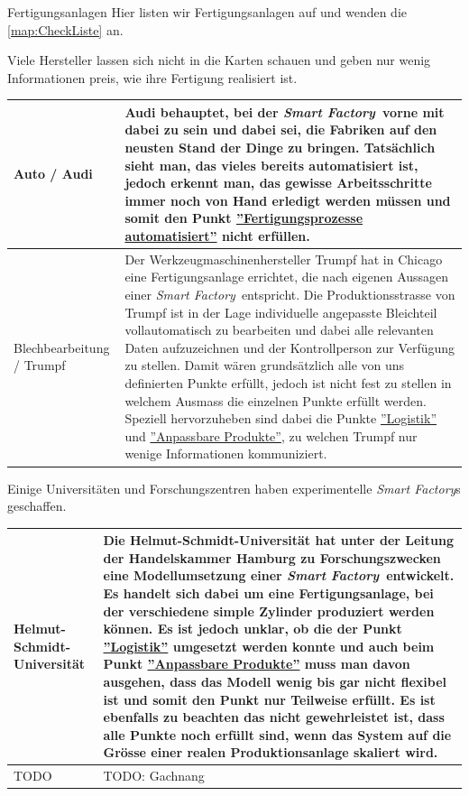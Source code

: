 \documentclass{article}
\def\SmartFactory{\textcolor{DarkestGray}{\textit{Smart Factory}}}
\begin{document}
\begin{Map}{Fertigungsanlagen}\label{map:Fertigungsanlagen}
Hier listen wir Fertigungsanlagen auf und wenden die \ref{map:CheckListe} an.

Viele Hersteller lassen sich nicht in die Karten schauen und geben nur wenig Informationen preis, wie ihre Fertigung realisiert ist. 
\par\medskip
\begin{tabular}{p{3.2cm}p{8cm}}\toprule
  Auto / Audi & Audi behauptet, bei der \SmartFactory\ vorne mit dabei zu sein und dabei sei, die Fabriken auf den neusten Stand der Dinge zu bringen. Tatsächlich sieht man, das vieles bereits automatisiert ist, jedoch erkennt man, das gewisse Arbeitsschritte immer noch von Hand erledigt werden müssen und somit den Punkt \hyperlink{CheckListe:Fertigungsprozess}{''Fertigungsprozesse automatisiert''} nicht erfüllen.\cite{Audi}\cite{AudiKommentarlos}\\\midrule
  Blechbearbeitung / Trumpf & Der Werkzeugmaschinenhersteller Trumpf hat in Chicago eine Fertigungsanlage errichtet, die nach eigenen Aussagen einer \SmartFactory\ entspricht. Die Produktionsstrasse von Trumpf ist in der Lage individuelle angepasste Bleichteil vollautomatisch zu bearbeiten und dabei alle relevanten Daten aufzuzeichnen und der Kontrollperson zur Verfügung zu stellen. Damit wären grundsätzlich alle von uns definierten Punkte erfüllt, jedoch ist nicht fest zu stellen in welchem Ausmass die einzelnen Punkte erfüllt werden. Speziell hervorzuheben sind dabei die Punkte \hyperlink{CheckListe:Fertigungsprozess}{''Logistik''} und \hyperlink{CheckListe:Fertigungsprozess}{''Anpassbare Produkte''}, zu welchen Trumpf nur wenige Informationen kommuniziert.\cite{Cicago}\cite{Automationspraxis}\\\bottomrule
\end{tabular}

Einige Universitäten und Forschungszentren haben experimentelle \SmartFactory s geschaffen.
\par\medskip
\begin{tabular}{p{3.2cm}p{8cm}}\toprule
  Helmut-Schmidt-Universität & Die Helmut-Schmidt-Universität hat unter der Leitung der Handelskammer Hamburg zu Forschungszwecken eine Modellumsetzung einer \SmartFactory\ entwickelt. Es handelt sich dabei um eine Fertigungsanlage, bei der verschiedene simple Zylinder produziert werden können. Es ist jedoch unklar, ob die der Punkt  \hyperlink{CheckListe:Fertigungsprozess}{''Logistik''} umgesetzt werden konnte und auch beim Punkt \hyperlink{CheckListe:Fertigungsprozess}{''Anpassbare Produkte''} muss man davon ausgehen, dass das Modell wenig bis gar nicht flexibel ist und somit den Punkt nur Teilweise erfüllt. Es ist ebenfalls zu beachten das nicht gewehrleistet ist, dass alle Punkte noch erfüllt sind, wenn das System auf die Grösse einer realen Produktionsanlage skaliert wird.\cite{UniSchmidt}\\\midrule
  TODO & TODO: Gachnang\\\bottomrule
\end{tabular}


\end{Map}
\end{document}
